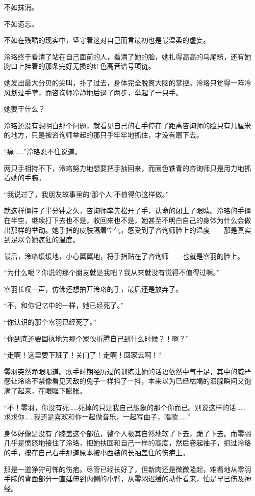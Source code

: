 \documentclass[UTF8, scheme = chinese, openany]{ctexbook}
\begin{document}
不如抹消。

不如遗忘。

不如在残酷的现实中，坚守着这对自己而言最初也是最温柔的虚妄。

泠珞终于看清了站在自己面前的人，看清了她的脸，她扎得高高的马尾辫，还有她胸口上挂着的那条完好无损的红色高音谱号项链。

她发出最大分贝的尖叫，扑了过去，身体完全脱离大脑的掌控。泠珞只觉得一阵冷风划过手掌，而咨询师冷静地后退了两步，举起了一只手。

她要干什么？

泠珞还没有想明白那个问题，就看见自己的右手停在了距离咨询师的脸只有几厘米的地方，只是被咨询师举起的那只手牢牢地抓住，才没有扇下去。

“痛……”泠珞忍不住说道。

两只手相持不下，泠珞努力地想要把手抽回来，而面色铁青的咨询师只是用力地抓着她的手腕。

“我说过了，我朋友故事里的‘那个人’不值得你这样做。”

就这样僵持了半分钟之久，咨询师率先松开了手，认命的闭上了眼睛。泠珞的手僵在半空，继续打下去也不是，收回来也不是，她甚至不明白自己的身体为什么会做出那样的举动。她手指的皮肤隔着空气，感受到了咨询师脸上的温度——那是真实到足以令她疯狂的温度。

最后，泠珞缓缓地，小心翼翼地，将手指贴在了咨询师——也就是零羽的脸上。

“为什么呢？你说的那个朋友就是我吧？我从来就没有觉得不值得过啊。”

零羽长叹一声，仿佛还想拍开泠珞的手，最后还是放弃了。

“不，和你记忆中的一样，她已经死了。”

“你认识的那个零羽已经死了。”

“你到底还要固执地为那个家伙折腾自己到什么时候？！啊？”

“走啊！这里要下班了！关门了！走啊！回家去啊！”

零羽突然睁眼喝道。歌手时期经历过的训练让她的话语依然中气十足，其中的威严感让泠珞不禁像看见天敌的兔子一样抖了一抖，本来以为已经枯竭的泪腺瞬间又饱满了起来，在眼眶下膨胀。

“不！零羽，你没有死……死掉的只是我自己想象的那个你而已。别说这样的话……求求你……我还是喜欢和你一起做音乐，一起写曲子，唱歌……”

身体好像是没有了膝盖这个部位，整个人极其自然地软了下去，跪了下去。而零羽几乎是愤怒地接住了泠珞，把她扶回和自己一样的高度，然后卷起袖子，抓过泠珞的手，按在自己右手那道原本被小西装的长袖盖住的伤疤上。

那是一道狰狞可怖的伤疤。尽管已经长好了，但新肉还是微微隆起，难看地从零羽手腕的背面部分一直延伸到内侧的小臂，从零羽迟缓的动作看来，怕是早已伤及神经。
\end{document}
